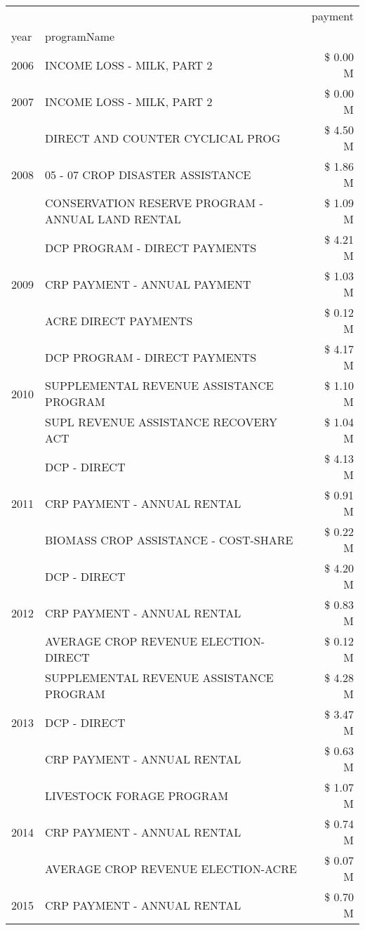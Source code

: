 \begin{tabular}{llr}
\toprule
 &  & payment \\
year & programName &  \\
\midrule
2006 & INCOME LOSS - MILK, PART 2 & \$ 0.00 M \\
\cline{1-3}
2007 & INCOME LOSS - MILK, PART 2 & \$ 0.00 M \\
\cline{1-3}
\multirow[t]{3}{*}{2008} & DIRECT AND COUNTER CYCLICAL PROG & \$ 4.50 M \\
 & 05 - 07 CROP DISASTER ASSISTANCE & \$ 1.86 M \\
 & CONSERVATION RESERVE PROGRAM - ANNUAL LAND RENTAL & \$ 1.09 M \\
\cline{1-3}
\multirow[t]{3}{*}{2009} & DCP PROGRAM - DIRECT PAYMENTS & \$ 4.21 M \\
 & CRP PAYMENT - ANNUAL PAYMENT & \$ 1.03 M \\
 & ACRE DIRECT PAYMENTS & \$ 0.12 M \\
\cline{1-3}
\multirow[t]{3}{*}{2010} & DCP PROGRAM - DIRECT PAYMENTS & \$ 4.17 M \\
 & SUPPLEMENTAL REVENUE ASSISTANCE PROGRAM & \$ 1.10 M \\
 & SUPL REVENUE ASSISTANCE RECOVERY ACT & \$ 1.04 M \\
\cline{1-3}
\multirow[t]{3}{*}{2011} & DCP - DIRECT & \$ 4.13 M \\
 & CRP PAYMENT - ANNUAL RENTAL & \$ 0.91 M \\
 & BIOMASS CROP ASSISTANCE - COST-SHARE & \$ 0.22 M \\
\cline{1-3}
\multirow[t]{3}{*}{2012} & DCP - DIRECT & \$ 4.20 M \\
 & CRP PAYMENT - ANNUAL RENTAL & \$ 0.83 M \\
 & AVERAGE CROP REVENUE ELECTION-DIRECT & \$ 0.12 M \\
\cline{1-3}
\multirow[t]{3}{*}{2013} & SUPPLEMENTAL REVENUE ASSISTANCE PROGRAM & \$ 4.28 M \\
 & DCP - DIRECT & \$ 3.47 M \\
 & CRP PAYMENT - ANNUAL RENTAL & \$ 0.63 M \\
\cline{1-3}
\multirow[t]{3}{*}{2014} & LIVESTOCK FORAGE PROGRAM & \$ 1.07 M \\
 & CRP PAYMENT - ANNUAL RENTAL & \$ 0.74 M \\
 & AVERAGE CROP REVENUE ELECTION-ACRE & \$ 0.07 M \\
\cline{1-3}
\multirow[t]{3}{*}{2015} & CRP PAYMENT - ANNUAL RENTAL & \$ 0.70 M \\

\end{tabular}
